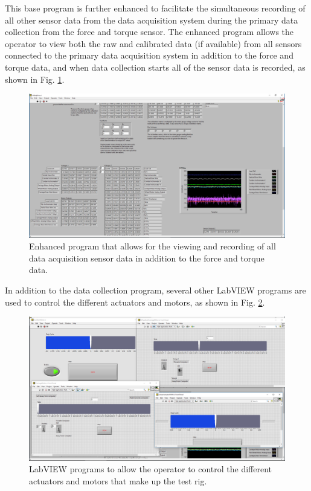 \documentclass{article}
\begin{document}
This base program is further enhanced to facilitate the simultaneous recording of all other sensor data from the data acquisition system during the primary data collection from the force and torque sensor. The enhanced program allows the operator to view both the raw and calibrated data (if available) from all sensors connected to the primary data acquisition system in addition to the force and torque data, and when data collection starts all of the sensor data is recorded, as shown in Fig. \ref{fig:sensor-screenshot}. 

\begin{figure}[hbt!]
\centering
\includegraphics[width=1.0\textwidth]{general-images/sensor_screenshot.png}
\caption{Enhanced program that allows for the viewing and recording of all data acquisition sensor data in addition to the force and torque data.}
\label{fig:sensor-screenshot}
\end{figure}

In addition to the data collection program, several other LabVIEW programs are used to control the different actuators and motors, as shown in Fig. \ref{fig:controls-screenshot}.

\begin{figure}[hbt!]
\centering
\includegraphics[width=1.0\textwidth]{general-images/controls_screenshot.png}
\caption{LabVIEW programs to allow the operator to control the different actuators and motors that make up the test rig.}
\label{fig:controls-screenshot}
\end{figure}
\end{document}
